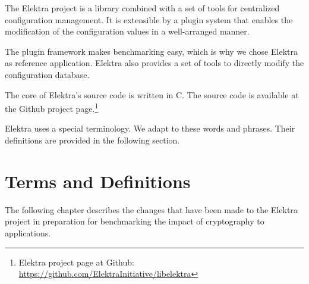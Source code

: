 The Elektra project is a library combined with a set of tools for centralized configuration management.
It is extensible by a plugin system that enables the modification of the configuration values in a well-arranged manner.\cite{raab2010thesis}

The plugin framework makes benchmarking easy, which is why we chose Elektra as reference application.
Elektra also provides a set of tools to directly modify the configuration database.

The core of Elektra's source code is written in C.
The source code is available at the Github project page.\footnote{Elektra project page at Github: \url{https://github.com/ElektraInitiative/libelektra}}

Elektra uses a special terminology.
We adapt to these words and phrases.
Their definitions are provided in the following section.

\section{Terms and Definitions}

The following chapter describes the changes that have been made to the Elektra project in preparation for benchmarking the impact of cryptography to applications.
